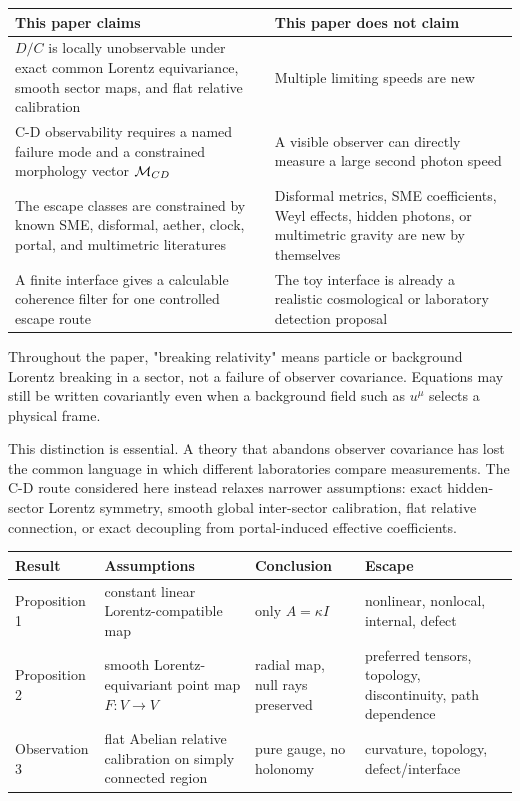 \documentclass[11pt]{article}
\begin{document}
\begin{center}
\small
\begin{tabularx}{\textwidth}{@{}>{\raggedright\arraybackslash}X >{\raggedright\arraybackslash}X@{}}
\toprule
This paper claims & This paper does not claim \\
\midrule
\(D/C\) is locally unobservable under exact common Lorentz equivariance, smooth sector maps, and flat relative calibration & Multiple limiting speeds are new \\
C-D observability requires a named failure mode and a constrained morphology vector \({\cal M}_{CD}\) & A visible observer can directly measure a large second photon speed \\
The escape classes are constrained by known SME, disformal, aether, clock, portal, and multimetric literatures & Disformal metrics, SME coefficients, Weyl effects, hidden photons, or multimetric gravity are new by themselves \\
A finite interface gives a calculable coherence filter for one controlled escape route & The toy interface is already a realistic cosmological or laboratory detection proposal \\
\bottomrule
\end{tabularx}
\end{center}


Throughout the paper, "breaking relativity" means particle or background Lorentz breaking in a sector, not a failure of observer covariance. Equations may still be written covariantly even when a background field such as \(u^\mu\) selects a physical frame.


This distinction is essential. A theory that abandons observer covariance has lost the common language in which different laboratories compare measurements. The C-D route considered here instead relaxes narrower assumptions: exact hidden-sector Lorentz symmetry, smooth global inter-sector calibration, flat relative connection, or exact decoupling from portal-induced effective coefficients.


\begin{center}
\small
\begin{tabularx}{\textwidth}{@{}>{\raggedright\arraybackslash}p{} >{\raggedright\arraybackslash}p{} >{\raggedright\arraybackslash}p{} >{\raggedright\arraybackslash}p{}@{}}
\toprule
Result & Assumptions & Conclusion & Escape \\
\midrule
Proposition 1 & constant linear Lorentz-compatible map & only \(A=\kappa I\) & nonlinear, nonlocal, internal, defect \\
Proposition 2 & smooth Lorentz-equivariant point map \(F:V\to V\) & radial map, null rays preserved & preferred tensors, topology, discontinuity, path dependence \\
Observation 3 & flat Abelian relative calibration on simply connected region & pure gauge, no holonomy & curvature, topology, defect/interface \\
\bottomrule
\end{tabularx}
\end{center}
\end{document}
